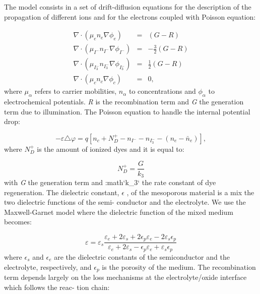 \documentclass[letterpaper,10pt,english]{sphinxmanual}
\begin{document}
The model consists in a set of drift-diflusion equations for the description of the
propagation of different ions and for the electrons coupled with Poisson equation:

\begin{eqnarray}
\nabla \cdot (\mu_{e}n_{e}\nabla\phi_{e}) & = & (G - R) \\
\nabla \cdot (\mu_{I^{-}}n_{I^{-}}\nabla\phi_{I^{-}}) & = & -\frac{3}{2}(G - R) \\
\nabla \cdot (\mu_{I^{-}_{3}}n_{I^{-}_{3}}\nabla\phi_{I^{-}_{3}}) & = & \frac{1}{2}(G - R) \\
\nabla \cdot (\mu_{c}n_{c}\nabla\phi_{c}) & = & 0,
\label{eq1}
\end{eqnarray}
where $\mu_\alpha$ refers to carrier mobilities, $n_\alpha$ to concentrations and $\phi_\alpha$ to electrochemical
potentials. \emph{R} is the recombination term and \emph{G} the generation term due to illumination.
The Poisson equation to handle the internal potential drop:

\begin{equation}\label{poisson}
-\varepsilon\triangle \varphi =  q[n_{c} + N_{D}^{+} - n_{I^{-}} - n_{I_{3}^{-}} - (n_{e} -
\bar{n}_{e})],
\end{equation}
where $N^+_D$ is the amount of ionized dyes and it is equal to:

\begin{equation}\label{dyeion}
N_{D}^{+} = \frac{G}{k_{3}}
\end{equation}
with \emph{G} the generation term and :math{}`k\_3{}` the rate constant of dye regeneration. The dielectric
constant, $\epsilon$ , of the mesoporous material is a mix the two dielectric functions of the semi-
conductor and the electrolyte. We use the Maxwell-Garnet model where the dielectric
function of the mixed medium becomes:

\begin{equation}\label{diel}
\varepsilon = \varepsilon_{s}\frac{\varepsilon_{e} + 2\varepsilon_{s} + 2\epsilon_{p}\varepsilon_{e} - 2\varepsilon_{s}\epsilon_{p}}
{\varepsilon_{e} + 2\varepsilon_{s} -\epsilon_{p}\varepsilon_{e} +\varepsilon_{s}\epsilon_{p}}
\end{equation}
where $\epsilon_s$ and $\epsilon_e$ are the dielectric constants of the semiconductor and the electrolyte,
respectively, and $\epsilon_p$ is the porosity of the medium. The recombination term depends
largely on the loss mechanisms at the electrolyte/oxide interface which follows the reac-
tion chain:
\end{document}
